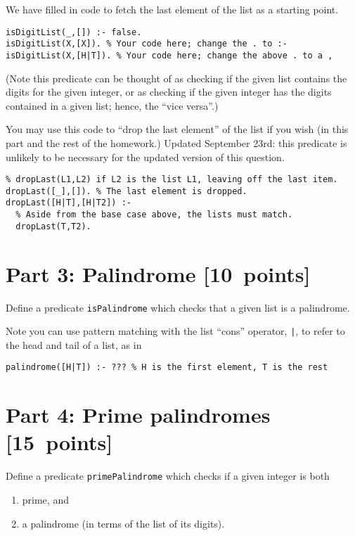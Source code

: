\documentclass[11pt]{article}
\begin{document}
We have filled in code to fetch the last element of the list
as a starting point.
\begin{verbatim}
isDigitList(_,[]) :- false.
isDigitList(X,[X]). % Your code here; change the . to :-
isDigitList(X,[H|T]). % Your code here; change the above . to a ,
\end{verbatim}

(Note this predicate can be thought of as checking if the given list contains
the digits for the given integer, or as checking if the given integer
has the digits contained in a given list; hence, the “vice versa”.)

You may use this code to “drop the last element” of the list
if you wish (in this part and the rest of the homework.)
Updated September 23rd: this predicate is unlikely to be necessary
for the updated version of this question.
\begin{verbatim}
% dropLast(L1,L2) if L2 is the list L1, leaving off the last item.
dropLast([_],[]). % The last element is dropped.
dropLast([H|T],[H|T2]) :-
  % Aside from the base case above, the lists must match.
  dropLast(T,T2).
\end{verbatim}

\section*{Part 3: Palindrome                                     [10 points]}
\label{sec:org6028e8e}
Define a predicate \texttt{isPalindrome} which checks that a given
list is a palindrome.

Note you can use pattern matching with the list “cons” operator, \texttt{|},
to refer to the head and tail of a list, as in
\begin{verbatim}
palindrome([H|T]) :- ??? % H is the first element, T is the rest
\end{verbatim}

\section*{Part 4: Prime palindromes                              [15 points]}
\label{sec:org7093d3e}
Define a predicate \texttt{primePalindrome} which checks
if a given integer is both
\begin{enumerate}
\item prime, and
\item a palindrome (in terms of the list of its digits).
\end{enumerate}
\end{document}
